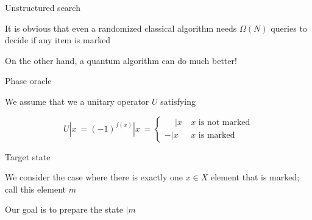


\begin{frame}{Unstructured search}

It is obvious that even a randomized classical algorithm needs $\Omega(N)$ queries to decide if any item is marked  

\bigskip
On the other hand, a quantum algorithm can do much better!
\end{frame}




\begin{frame}{Phase oracle}

We assume that we a unitary operator $U$ satisfying

\[
  U|x\> = (-1)^{f(x)} |x\> = 
  \begin{cases}
  	\phantom{-} |x\> & x \text{~is not marked} \\
             -  |x\> & x \text{~is marked}
  \end{cases}
\]

\end{frame}




\begin{frame}{Target state}

We consider the case where there is exactly one $x\in X$ element that is marked; call this element $m$

\bigskip
Our goal is to prepare the state $|m\>$

\end{frame}




